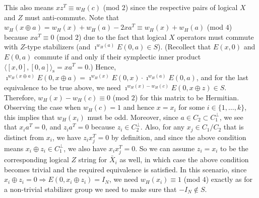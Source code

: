 \documentclass[twoside,romanappendices]{IEEEtran}
\newcommand{\syminn}[2]{\langle #1, #2 \rangle_{\text{s}}}
\begin{document}
This also means $xz^T \equiv w_H(c)$ (mod $2$) since the respective pairs of logical $X$ and $Z$ must anti-commute.
Note that $w_H(x \oplus a) = w_H(x) + w_H(a) - 2 xa^T \equiv w_H(x) + w_H(a)$ (mod $4$) because $xa^T \equiv 0$ (mod $2$) due to the fact that logical $X$ operators must commute with $Z$-type stabilizers (and $\imath^{w_H(a)} E(0,a) \in S$).
(Recollect that $E(x,0)$ and $E(0,a)$ commute if and only if their symplectic inner product $\syminn{[x,0]}{[0,a]} = xa^T = 0$.)
Hence, $\imath^{w_H(x \oplus a)} E(0, x \oplus a) = \imath^{w_H(x)} E(0,x) \cdot \imath^{w_H(a)} E(0,a)$, and for the last equivalence to be true above, we need $\imath^{w_H(x) - w_H(c)} E(0,x \oplus z) \in S$. 
Therefore, $w_H(x) - w_H(c) \equiv 0$ (mod $2$) for this matrix to be Hermitian. 
Observing the case when $w_H(c) = 1$ and hence $x = x_i$ for some $i \in \{1,\ldots,k\}$, this implies that $w_H(x_i)$ must be odd. 
Moreover, since $a \in C_2 \subset C_1^{\perp}$, we see that $x_i a^T = 0$, and $z_i a^T = 0$ because $z_i \in C_2^{\perp}$.
Also, for any $x_j \in C_1/C_2$ that is distinct from $x_i$, we have $z_i x_j^T = 0$ by definition, and since the above condition means $x_i \oplus z_i \in C_1^{\perp}$, we also have $x_i x_j^T = 0$.
So we can assume $z_i = x_i$ to be the corresponding logical $Z$ string for $\bar{X}_i$ as well, in which case the above condition becomes trivial and the required equivalence is satisfied.
In this scenario, since $x_i \oplus z_i = 0 \Rightarrow E(0,x_i \oplus z_i) = I_N$, we need $w_H(x_i) \equiv 1$ (mod $4$) exactly as for a non-trivial stabilizer group we need to make sure that $-I_N \notin S$.
\end{document}

